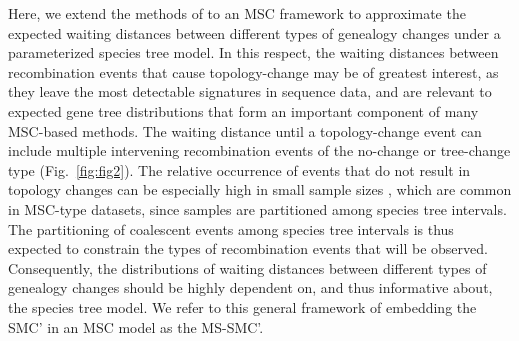 \documentclass[11pt]{article}
\begin{document}






Here, we extend the methods of \citet{deng_distribution_2021} to an MSC framework
to approximate the expected waiting distances between different types of 
genealogy changes under a parameterized species tree model. In this respect, 
the waiting distances between recombination events that cause topology-change 
may be of greatest interest, as they leave the most detectable signatures 
in sequence data, and are relevant to expected gene tree distributions that form
an important component of many MSC-based methods.
The waiting distance until a topology-change event can include multiple
intervening recombination events of the no-change or tree-change type
(Fig.~\ref{fig:fig2}). 
The relative occurrence of events that do not result in topology 
changes can be especially high in small sample sizes \citep{wilton2015smc}, 
which are common in MSC-type datasets, since samples are partitioned 
among species tree intervals. 
The partitioning of 
coalescent events among species tree intervals is thus expected to constrain 
the types of recombination events that will be observed. Consequently, the
distributions of waiting distances between different types of 
genealogy changes should be highly dependent on, and thus informative about, 
the species tree model. We refer to this general framework of embedding the 
SMC' in an MSC model as the MS-SMC'.
\end{document}
